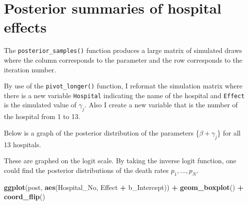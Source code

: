 \documentclass[
]{book}
\newenvironment{Shaded}{\begin{snugshade}}{\end{snugshade}}
\newcommand{\DataTypeTok}[1]{\textcolor[rgb]{0.13,0.29,0.53}{#1}}
\newcommand{\KeywordTok}[1]{\textcolor[rgb]{0.13,0.29,0.53}{\textbf{#1}}}
\newcommand{\NormalTok}[1]{#1}
\newcommand{\OperatorTok}[1]{\textcolor[rgb]{0.81,0.36,0.00}{\textbf{#1}}}
\newcommand{\StringTok}[1]{\textcolor[rgb]{0.31,0.60,0.02}{#1}}
\begin{document}
\hypertarget{posterior-summaries-of-hospital-effects}{%
\section{Posterior summaries of hospital effects}\label{posterior-summaries-of-hospital-effects}}

The \texttt{posterior\_samples()} function produces a large matrix of simulated draws where the column corresponds to the parameter and the row corresponds to the iteration number.

By use of the \texttt{pivot\_longer()} function, I reformat the simulation matrix where there is a new variable \texttt{Hospital} indicating the name of the hospital and \texttt{Effect} is the simulated value of \(\gamma_j\). Also I create a new variable that is the number of the hospital from 1 to 13.

\begin{Shaded}
\end{Shaded}

Below is a graph of the posterior distribution of the parameters \{\(\beta + \gamma_j\)\} for all 13 hospitals.

These are graphed on the logit scale. By taking the inverse logit function, one could find the posterior distributions of the death rates \(p_1, ..., p_N\).

\begin{Shaded}
\begin{Highlighting}[]
\KeywordTok{ggplot}\NormalTok{(post, }\KeywordTok{aes}\NormalTok{(Hospital_No, Effect }\OperatorTok{+}\StringTok{ }\NormalTok{b_Intercept)) }\OperatorTok{+}
\StringTok{  }\KeywordTok{geom_boxplot}\NormalTok{() }\OperatorTok{+}
\StringTok{  }\KeywordTok{coord_flip}\NormalTok{()}
\end{Highlighting}
\end{Shaded}
\end{document}

